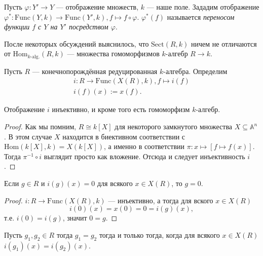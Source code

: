 \documentclass[12pt,a4paper]{article}
\renewcommand{\AA}{\ensuremath{\mathbb{A}}\xspace}
\newcommand{\Func}{\mathrm{Func}}
\newcommand{\Sect}{\mathrm{Sect}}
\newcommand{\Hom}{\mathrm{Hom}}
\begin{document}
    \begin{definition}
        Пусть $\varphi: Y' \to Y$ --- отображение множеств, $k$ --- наше поле. Зададим отображение $\varphi^*: \Func(Y, k) \to \Func(Y', k), f \mapsto f \circ \varphi$. $\varphi^*(f)$ называется \emph{переносом функции $f$ с $Y$ на $Y'$ посредством $\varphi$}.
    \end{definition}

    \begin{remark*}
        После некоторых обсуждений выяснилось, что $\Sect(R, k)$ ничем не отличаются от $\Hom_{\text{$k$-alg.}}(R, k)$ --- множества гомоморфизмов $k$-алгебр $R \to k$.
    \end{remark*}

    \begin{definition}
        Пусть $R$ --- конечнопорождённая редуцированная $k$-алгебра. Определим
        \begin{gather*}
            i: R \to \Func(X(R), k), f \mapsto i(f)\\
            i(f)(x) := x(f).
        \end{gather*}
    \end{definition}

    \begin{lemma}
        Отображение $i$ инъективно, и кроме того есть гомоморфизм $k$-алгебр.
    \end{lemma}

    \begin{proof}
        Как мы помним, $R \cong k[X]$ для некоторого замкнутого множества $X \subseteq \AA^n$. В этом случае $X$ находится в биективном соответствии с $\Hom(k[X], k) = X(k[X])$, а именно в соответствии $\pi: x \mapsto [f \mapsto f(x)]$. Тогда $\pi^{-1} \circ i$ выглядит просто как вложение. Отсюда и следует инъективность $i$.
    \end{proof}

    \begin{corollary}
        Если $g \in R$ и $i(g)(x) = 0$ для всякого $x \in X(R)$, то $g = 0$.
    \end{corollary}

    \begin{proof}
        $i: R \to \Func(X(R), k)$ --- инъективно, а тогда для вского $x \in X(R)$
        \[i(0)(x) = x(0) = 0 = i(g)(x),\]
        т.е. $i(0) = i(g)$, значит $0 = g$.
    \end{proof}

    \begin{corollary}
        Пусть $g_1, g_2 \in R$ тогда $g_1 = g_2$ тогда и только тогда, когда для всякого $x \in X(R)$ $i(g_1)(x) = i(g_2)(x)$.
    \end{corollary}
\end{document}
